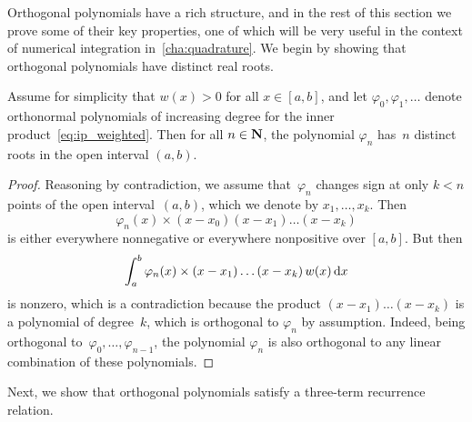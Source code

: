 Orthogonal polynomials have a rich structure,
and in the rest of this section we prove some of their key properties,
one of which will be very useful in the context of numerical integration in~\cref{cha:quadrature}.
We begin by showing that
orthogonal polynomials have distinct real roots.
\begin{proposition}
    \label{proposition:distinct_roots}
    Assume for simplicity that $w(x) > 0$ for all $x \in [a, b]$,
    and let $\varphi_0, \varphi_1, \dotsc$ denote orthonormal polynomials of increasing degree for the inner product~\eqref{eq:ip_weighted}.
    Then for all $n \in \mathbf N$,
    the polynomial $\varphi_n$ has~$n$ distinct roots in the open interval $(a, b)$.
\end{proposition}
\begin{proof}
    Reasoning by contradiction,
    we assume that~$\varphi_n$ changes sign at only $k < n$ points of the open interval~$(a, b)$,
    which we denote by $x_1, \dotsc, x_k$.
    Then
    \[
        \varphi_n(x) \times (x - x_0) (x - x_1) \dotsc (x - x_k)
    \]
    is either everywhere nonnegative or everywhere nonpositive over $[a, b]$.
    But then
    \[
        \int_{a}^{b} \varphi_n(x) \times (x - x_1)  \dotsc (x - x_k) \, w(x) \, \mathrm d x
    \]
    is nonzero,
    which is a contradiction because the product $(x-x_1) \dotsc (x-x_k)$ is a polynomial of degree~$k$,
    which is orthogonal to $\varphi_n$ by assumption.
    Indeed, being orthogonal to~$\varphi_0, \dotsc, \varphi_{n-1}$,
    the polynomial $\varphi_n$ is also orthogonal to any linear combination of these polynomials.
\end{proof}

Next, we show that orthogonal polynomials satisfy a three-term recurrence relation.

